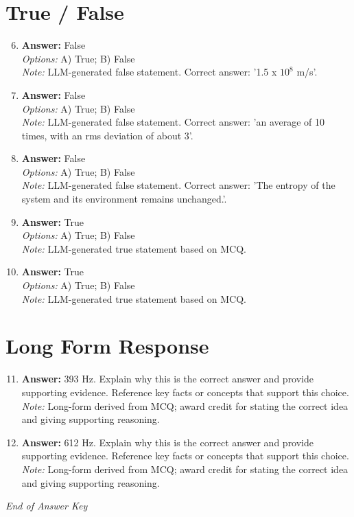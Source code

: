 \documentclass[12pt]{article}
\begin{document}
\section*{True / False}
\begin{enumerate}[label=\arabic*.]
\setcounter{enumi}{5}
\item \textbf{Answer:} False
\\ \textit{Options:} A) True; B) False
\\ \textit{Note:} LLM-generated false statement. Correct answer: '1.5 x $10^8$ m/s'.
\item \textbf{Answer:} False
\\ \textit{Options:} A) True; B) False
\\ \textit{Note:} LLM-generated false statement. Correct answer: 'an average of 10 times, with an rms deviation of about 3'.
\item \textbf{Answer:} False
\\ \textit{Options:} A) True; B) False
\\ \textit{Note:} LLM-generated false statement. Correct answer: 'The entropy of the system and its environment remains unchanged.'.
\item \textbf{Answer:} True
\\ \textit{Options:} A) True; B) False
\\ \textit{Note:} LLM-generated true statement based on MCQ.
\item \textbf{Answer:} True
\\ \textit{Options:} A) True; B) False
\\ \textit{Note:} LLM-generated true statement based on MCQ.
\end{enumerate}

\section*{Long Form Response}
\begin{enumerate}[label=\arabic*.]
\setcounter{enumi}{10}
\item \textbf{Answer:} 393 Hz. Explain why this is the correct answer and provide supporting evidence. Reference key facts or concepts that support this choice.
\\ \textit{Note:} Long-form derived from MCQ; award credit for stating the correct idea and giving supporting reasoning.
\item \textbf{Answer:} 612 Hz. Explain why this is the correct answer and provide supporting evidence. Reference key facts or concepts that support this choice.
\\ \textit{Note:} Long-form derived from MCQ; award credit for stating the correct idea and giving supporting reasoning.
\end{enumerate}

\vfill
\noindent\textit{End of Answer Key}
\end{document}
